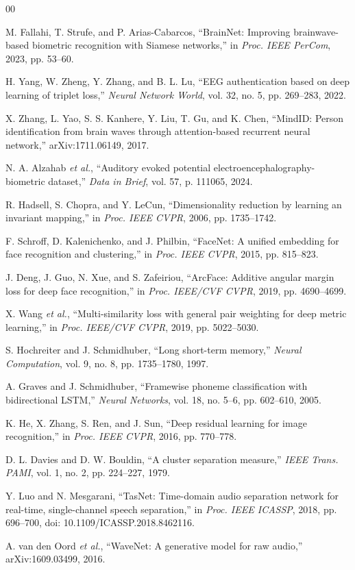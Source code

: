 \documentclass[conference]{IEEEtran}
\begin{document}
\begin{thebibliography}{00}

 M. Fallahi, T. Strufe, and P. Arias-Cabarcos, ``BrainNet: Improving brainwave-based biometric recognition with Siamese networks,'' in \textit{Proc. IEEE PerCom}, 2023, pp. 53--60.

 H. Yang, W. Zheng, Y. Zhang, and B. L. Lu, ``EEG authentication based on deep learning of triplet loss,'' \textit{Neural Network World}, vol. 32, no. 5, pp. 269--283, 2022.

 X. Zhang, L. Yao, S. S. Kanhere, Y. Liu, T. Gu, and K. Chen, ``MindID: Person identification from brain waves through attention-based recurrent neural network,'' arXiv:1711.06149, 2017.

 N. A. Alzahab \textit{et al.}, ``Auditory evoked potential electroencephalography-biometric dataset,'' \textit{Data in Brief}, vol. 57, p. 111065, 2024.

 R. Hadsell, S. Chopra, and Y. LeCun, ``Dimensionality reduction by learning an invariant mapping,'' in \textit{Proc. IEEE CVPR}, 2006, pp. 1735--1742.

 F. Schroff, D. Kalenichenko, and J. Philbin, ``FaceNet: A unified embedding for face recognition and clustering,'' in \textit{Proc. IEEE CVPR}, 2015, pp. 815--823.

 J. Deng, J. Guo, N. Xue, and S. Zafeiriou, ``ArcFace: Additive angular margin loss for deep face recognition,'' in \textit{Proc. IEEE/CVF CVPR}, 2019, pp. 4690--4699.

 X. Wang \textit{et al.}, ``Multi-similarity loss with general pair weighting for deep metric learning,'' in \textit{Proc. IEEE/CVF CVPR}, 2019, pp. 5022--5030.

 S. Hochreiter and J. Schmidhuber, ``Long short-term memory,'' \textit{Neural Computation}, vol. 9, no. 8, pp. 1735--1780, 1997.

 A. Graves and J. Schmidhuber, ``Framewise phoneme classification with bidirectional LSTM,'' \textit{Neural Networks}, vol. 18, no. 5--6, pp. 602--610, 2005.

 K. He, X. Zhang, S. Ren, and J. Sun, ``Deep residual learning for image recognition,'' in \textit{Proc. IEEE CVPR}, 2016, pp. 770--778.

 D. L. Davies and D. W. Bouldin, ``A cluster separation measure,'' \textit{IEEE Trans. PAMI}, vol. 1, no. 2, pp. 224--227, 1979.

 Y. Luo and N. Mesgarani, ``TasNet: Time-domain audio separation network for real-time, single-channel speech separation,'' in \textit{Proc. IEEE ICASSP}, 2018, pp. 696--700, doi: 10.1109/ICASSP.2018.8462116.

 A. van den Oord \textit{et al.}, ``WaveNet: A generative model for raw audio,'' arXiv:1609.03499, 2016.

\end{thebibliography}
\end{document}
